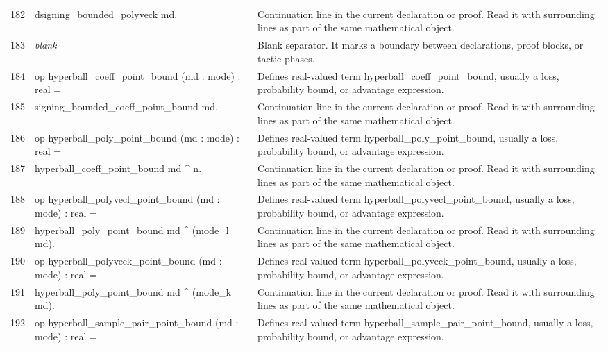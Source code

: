 \documentclass[10pt]{article}
\begin{document}
\begin{longtable}{r L{0.53\textwidth} L{0.37\textwidth}}
182 & {\ttfamily\scriptsize   dsigning\_bounded\_polyveck md.} & Continuation line in the current declaration or proof.  Read it with surrounding lines as part of the same mathematical object. \\
183 & {\ttfamily\scriptsize \emph{blank}} & Blank separator.  It marks a boundary between declarations, proof blocks, or tactic phases. \\
184 & {\ttfamily\scriptsize op hyperball\_coeff\_point\_bound (md : mode) : real =} & Defines real-valued term hyperball\_coeff\_point\_bound, usually a loss, probability bound, or advantage expression. \\
185 & {\ttfamily\scriptsize   signing\_bounded\_coeff\_point\_bound md.} & Continuation line in the current declaration or proof.  Read it with surrounding lines as part of the same mathematical object. \\
186 & {\ttfamily\scriptsize op hyperball\_poly\_point\_bound (md : mode) : real =} & Defines real-valued term hyperball\_poly\_point\_bound, usually a loss, probability bound, or advantage expression. \\
187 & {\ttfamily\scriptsize   hyperball\_coeff\_point\_bound md \textasciicircum{} n.} & Continuation line in the current declaration or proof.  Read it with surrounding lines as part of the same mathematical object. \\
188 & {\ttfamily\scriptsize op hyperball\_polyvecl\_point\_bound (md : mode) : real =} & Defines real-valued term hyperball\_polyvecl\_point\_bound, usually a loss, probability bound, or advantage expression. \\
189 & {\ttfamily\scriptsize   hyperball\_poly\_point\_bound md \textasciicircum{} (mode\_l md).} & Continuation line in the current declaration or proof.  Read it with surrounding lines as part of the same mathematical object. \\
190 & {\ttfamily\scriptsize op hyperball\_polyveck\_point\_bound (md : mode) : real =} & Defines real-valued term hyperball\_polyveck\_point\_bound, usually a loss, probability bound, or advantage expression. \\
191 & {\ttfamily\scriptsize   hyperball\_poly\_point\_bound md \textasciicircum{} (mode\_k md).} & Continuation line in the current declaration or proof.  Read it with surrounding lines as part of the same mathematical object. \\
192 & {\ttfamily\scriptsize op hyperball\_sample\_pair\_point\_bound (md : mode) : real =} & Defines real-valued term hyperball\_sample\_pair\_point\_bound, usually a loss, probability bound, or advantage expression. \\

\end{longtable}
\end{document}
